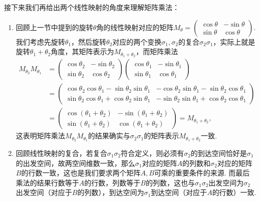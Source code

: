 接下来我们再给出两个线性映射的角度来理解矩阵乘法：
\begin{enumerate}
    \item 回顾上一节中提到的旋转$\theta$角的线性映射对应的矩阵$M_{\theta}=\begin{pmatrix}
                  \cos\theta & -\sin\theta \\
                  \sin\theta & \cos\theta
              \end{pmatrix}$. 我们考虑先旋转$\theta_1$，然后旋转$\theta_2$对应的两个变换$\sigma_1,\sigma_2$的复合$\sigma_2\sigma_1$，实际上就是旋转$\theta_1+\theta_2$角度，其矩阵表示为$M_{\theta_1+\theta_2}$，而矩阵乘法
          \begin{align*}
              M_{\theta_2}M_{\theta_1}
               & =\begin{pmatrix}
                      \cos\theta_2 & -\sin\theta_2 \\
                      \sin\theta_2 & \cos\theta_2
                  \end{pmatrix}\begin{pmatrix}
                                   \cos\theta_1 & -\sin\theta_1 \\
                                   \sin\theta_1 & \cos\theta_1
                               \end{pmatrix}                                                              \\
               & =\begin{pmatrix}
                      \cos\theta_2\cos\theta_1-\sin\theta_2\sin\theta_1 & -\cos\theta_2\sin\theta_1-\sin\theta_2\cos\theta_1 \\
                      \sin\theta_2\cos\theta_1+\cos\theta_2\sin\theta_1 & -\sin\theta_2\sin\theta_1+\cos\theta_2\cos\theta_1
                  \end{pmatrix} \\
               & =\begin{pmatrix}
                      \cos(\theta_1+\theta_2) & -\sin(\theta_1+\theta_2) \\
                      \sin(\theta_1+\theta_2) & \cos(\theta_1+\theta_2)
                  \end{pmatrix}=M_{\theta_1+\theta_2},
          \end{align*}
          这表明矩阵乘法$M_{\theta_2}M_{\theta_1}$的结果确实与$\sigma_2\sigma_1$的矩阵表示$M_{\theta_1+\theta_2}$一致.

    \item 回顾线性映射的复合，若复合$\sigma_1\sigma_2$符合定义，则必须有$\sigma_2$的到达空间恰好是$\sigma_1$的出发空间，故两空间维数一致，那么$\sigma_1$对应的矩阵$A$的列数和$\sigma_2$对应的矩阵$B$的行数一致，这也是我们要求两个矩阵$A,B$可乘的重要条件的来源. 而最后乘法的结果行数等于$A$的行数，列数等于$B$的列数，这也与$\sigma_1\sigma_2$出发空间为$\sigma_2$出发空间（对应于$B$的列数），到达空间为$\sigma_1$到达空间（对应于$A$的行数）一致.
\end{enumerate}


